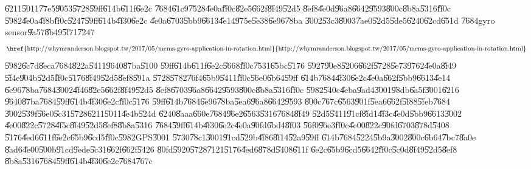 \U{6211}\U{5011}\U{77e5}\U{9053}\U{5728}\U{59ff}\U{614b}\U{611f}\U{6e2c}%
\U{7684}\U{61c9}\U{7528}\U{4e0a}\U{ff0c}\U{82e5}\U{662f}\U{8f49}\U{52d5}%
\U{8ef8}\U{4e0d}\U{96a8}\U{6642}\U{9593}\U{800c}\U{8b8a}\U{5316}\U{ff0c}%
\U{5982}\U{4e0a}\U{4f8b}\U{ff0c}\U{5247}\U{59ff}\U{614b}\U{4f30}\U{6e2c}%
\U{4e0a}\U{6703}\U{5bb9}\U{6613}\U{4e14}\U{975e}\U{5e38}\U{6e96}\U{78ba}%
\U{3002}\U{53c3}\U{8003}\U{7ae0}\U{52d5}\U{5de5}\U{6240}\U{62cd}\U{651d}%
\U{7684}gyro sensor\U{9a57}\U{8b49}\U{5f71}\U{7247}%
\begin{equation*}
\text{\href{http://whymranderson.blogspot.tw/2017/05/mems-gyro-application-in-rotation.html%
}{%
http://whymranderson.blogspot.tw/2017/05/mems-gyro-application-in-rotation.html%
}}
\end{equation*}%
\U{5982}\U{6c7d}\U{8eca}\U{7684}\U{822a}\U{5411}\U{9640}\U{87ba}\U{5100}%
\U{59ff}\U{614b}\U{611f}\U{6e2c}\U{5668}\U{ff0c}\U{7531}\U{65bc}\U{5176}%
\U{5927}\U{90e8}\U{5206}\U{662f}\U{5728}\U{5e73}\U{9762}\U{4e0a}\U{8f49}%
\U{5f4e}\U{904b}\U{52d5}\U{ff0c}\U{5176}\U{8f49}\U{52d5}\U{8ef8}\U{591a}%
\U{5728}\U{5782}\U{76f4}\U{65b9}\U{5411}\U{ff0c}\U{56e0}\U{6b64}\U{59ff}%
\U{614b}\U{7684}\U{4f30}\U{6e2c}\U{4e0a}\U{662f}\U{5bb9}\U{6613}\U{4e14}%
\U{6e96}\U{78ba}\U{7684}\U{3002}\U{4f46}\U{82e5}\U{662f}\U{8f49}\U{52d5}%
\U{8ef8}\U{6703}\U{96a8}\U{6642}\U{9593}\U{800c}\U{8b8a}\U{5316}\U{ff0c}%
\U{5982}\U{540c}\U{4eba}\U{9ad4}\U{3001}\U{98db}\U{6a5f}\U{3001}\U{6216}%
\U{9640}\U{87ba}\U{7684}\U{59ff}\U{614b}\U{4f30}\U{6e2c}\U{ff0c}\U{5176}%
\U{59ff}\U{614b}\U{7684}\U{6e96}\U{78ba}\U{5ea6}\U{96a8}\U{6642}\U{9593}%
\U{800c}\U{767c}\U{6563}\U{901f}\U{5ea6}\U{662f}\U{5f88}\U{5feb}\U{7684}%
\U{3002}\U{539f}\U{56e0}\U{5c31}\U{5728}\U{6211}\U{5011}\U{4e4b}\U{524d}%
\U{6240}\U{8aaa}\U{660e}\U{7684}\U{96e2}\U{6563}\U{5316}\U{7684}\U{8f49}%
\U{52d5}\U{5411}\U{91cf}\U{8fd1}\U{4f3c}\U{4e0d}\U{5bb9}\U{6613}\U{3002}%
\U{4e00}\U{822c}\U{5728}\U{4f5c}\U{8f49}\U{52d5}\U{8ef8}\U{8b8a}\U{5316}%
\U{7684}\U{59ff}\U{614b}\U{4f30}\U{6e2c}\U{4e0a}\U{90fd}\U{6bd4}\U{8f03}%
\U{56f0}\U{96e3}\U{ff0c}\U{4e00}\U{822c}\U{90fd}\U{6703}\U{878d}\U{5408}%
\U{5176}\U{4ed6}\U{611f}\U{6e2c}\U{65b9}\U{6cd5}\U{ff0c}\U{5982}GPS\U{3001}%
\U{5730}\U{78c1}\U{3001}\U{91cd}\U{529b}\U{4f86}\U{8f14}\U{52a9}\U{59ff}%
\U{614b}\U{7684}\U{5224}\U{5b9a}\U{3002}\U{800c}\U{6b64}\U{7bc7}\U{8a0e}%
\U{8ad6}\U{4e00}\U{500b}\U{91cd}\U{9ede}\U{5c31}\U{662f}\U{662f}\U{5426}%
\U{80fd}\U{5920}\U{5728}\U{7121}\U{5176}\U{4ed6}\U{878d}\U{5408}\U{611f}%
\U{6e2c}\U{65b9}\U{6cd5}\U{6642}\U{ff0c}\U{5c0d}\U{8f49}\U{52d5}\U{8ef8}%
\U{8b8a}\U{5316}\U{7684}\U{59ff}\U{614b}\U{4f30}\U{6e2c}\U{7684}\U{767c}%
